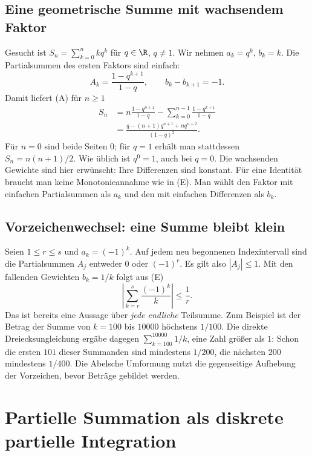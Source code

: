 \subsection*{Eine geometrische Summe mit wachsendem Faktor}

Gesucht ist $S_n=\sum_{k=0}^{n}kq^k$ für $q\in\R$, $q\ne1$.
Wir nehmen $a_k=q^k$, $b_k=k$. Die Partialsummen des ersten Faktors
sind einfach:
\[
 A_k=\frac{1-q^{k+1}}{1-q},\qquad b_k-b_{k+1}=-1.
\]
Damit liefert (A) für $n\geq1$
\begin{align*}
 S_n
 &=n\frac{1-q^{n+1}}{1-q}
   -\sum_{k=0}^{n-1}\frac{1-q^{k+1}}{1-q}\\
 &=\frac{q-(n+1)q^{n+1}+nq^{n+2}}{(1-q)^2}.
\end{align*}
Für $n=0$ sind beide Seiten $0$; für $q=1$ erhält man stattdessen
$S_n=n(n+1)/2$. Wie üblich ist $q^0=1$, auch bei $q=0$.
Die wachsenden Gewichte sind hier erwünscht: Ihre Differenzen sind
konstant. Für eine Identität braucht man keine Monotonieannahme wie
in (E). Man wählt den Faktor mit einfachen Partialsummen als $a_k$
und den mit einfachen Differenzen als $b_k$.

\subsection*{Vorzeichenwechsel: eine Summe bleibt klein}

Seien $1\leq r\leq s$ und $a_k=(-1)^k$. Auf jedem neu begonnenen
Indexintervall sind die Partialsummen $A_j$ entweder $0$ oder
$(-1)^r$. Es gilt also $|A_j|\leq1$. Mit den fallenden Gewichten
$b_k=1/k$ folgt aus (E)
\[
 \boxed{\displaystyle
 \left|\sum_{k=r}^{s}\frac{(-1)^k}{k}\right|\leq\frac1r.}
\]
Das ist bereits eine Aussage über \emph{jede endliche} Teilsumme.
Zum Beispiel ist der Betrag der Summe von $k=100$ bis $10000$
höchstens $1/100$. Die direkte Dreiecksungleichung ergäbe dagegen
$\sum_{k=100}^{10000}1/k$, eine Zahl größer als $1$:
Schon die ersten $101$ dieser Summanden sind mindestens $1/200$,
die nächsten $200$ mindestens $1/400$.
Die Abelsche Umformung nutzt die gegenseitige Aufhebung der Vorzeichen,
bevor Beträge gebildet werden.

\section{Partielle Summation als diskrete partielle Integration}

